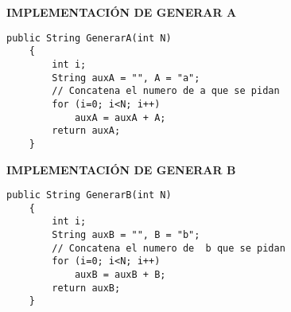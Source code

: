 \documentclass[12pt]{article}
\begin{document}
	\textbf{IMPLEMENTACIÓN DE GENERAR A}
	\begin{lstlisting}[style=Java]
	public String GenerarA(int N)
	{
		int i;
		String auxA = "", A = "a";
		// Concatena el numero de a que se pidan
		for (i=0; i<N; i++)
			auxA = auxA + A;
		return auxA;
	}
	\end{lstlisting}			
	\newpage
	\textbf{IMPLEMENTACIÓN DE GENERAR B}
	\begin{lstlisting}[style=Java]
	public String GenerarB(int N)
	{
		int i;
		String auxB = "", B = "b";
		// Concatena el numero de  b que se pidan
		for (i=0; i<N; i++)
			auxB = auxB + B;
		return auxB;
	}

	\end{lstlisting}			
\newpage

\end{document}

